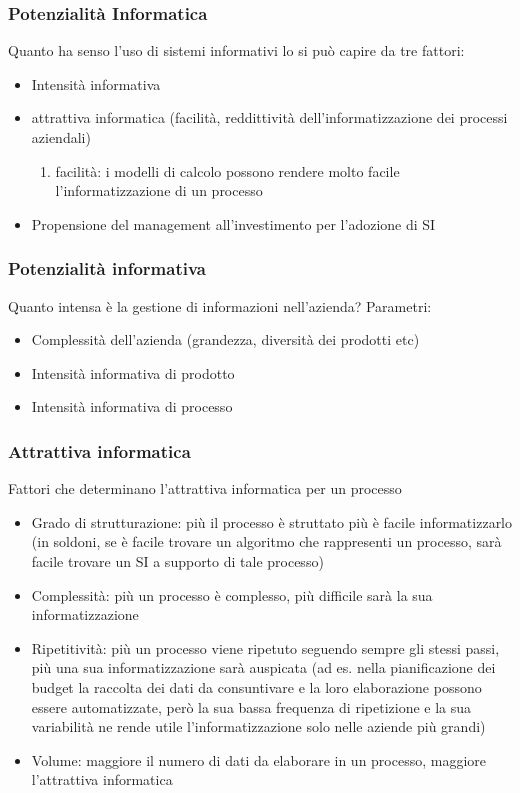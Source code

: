 \subsubsection{Potenzialit\`a Informatica}

Quanto ha senso l'uso di sistemi informativi lo si pu\`o capire da tre fattori:
\begin{itemize}
  \item Intensit\`a informativa
  \item attrattiva informatica (facilit\`a, reddittivit\`a dell'informatizzazione
  dei processi aziendali)
  \begin{enumerate}
    \item facilit\`a: i modelli di calcolo possono rendere molto facile l'informatizzazione
    di un processo
  \end{enumerate}
  \item Propensione del management all'investimento per l'adozione di SI
\end{itemize}
\subsubsection{Potenzialit\`a informativa}
Quanto intensa \`e la gestione di informazioni nell'azienda?
Parametri:
\begin{itemize}
  \item Complessit\`a dell'azienda (grandezza, diversit\`a dei prodotti etc)
  \item Intensit\`a informativa di prodotto
  \item Intensit\`a informativa di processo
\end{itemize}
\subsubsection{Attrattiva informatica}
\label{subs:Attrattiva informatica}
Fattori che determinano l'attrattiva informatica per un processo
\begin{itemize}
  \item Grado di strutturazione: pi\`u il processo \`e struttato pi\`u \`e facile
  informatizzarlo (in soldoni, se \`e facile trovare un algoritmo che rappresenti un processo, sar\`a
  facile trovare un SI a supporto di tale processo)
  \item Complessit\`a: pi\`u un processo \`e complesso, pi\`u difficile sar\`a
  la sua informatizzazione
  \item Ripetitivit\`a: pi\`u un processo viene ripetuto seguendo sempre
  gli stessi passi, pi\`u una sua informatizzazione sar\`a auspicata
  (ad es. nella pianificazione dei budget la raccolta dei dati da consuntivare e la loro elaborazione
  possono essere automatizzate, per\`o la sua bassa frequenza di ripetizione e la sua variabilit\`a
  ne rende utile l'informatizzazione solo nelle aziende pi\`u grandi)
  \item Volume: maggiore il numero di dati da elaborare in un processo, maggiore
  l'attrattiva informatica
\end{itemize}

